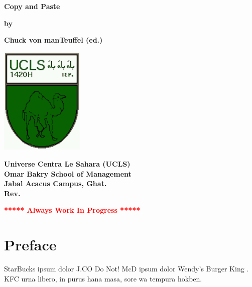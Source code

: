 \documentclass[12pt]{book}
\newcommand{\pengarangs}{%
    Chuck von manTeuffel (ed.)
}
\newcommand{\judul}{%
Copy and Paste
}
\begin{document}
\begin{titlepage}
    \begin{center}    

    \vspace*{15mm}
    \textbf{\Large \judul}

    \vspace*{30mm}       
    \textbf{by}

    \vspace*{15mm}    
    \textbf{\Large \pengarangs}

    \vspace*{4.0cm}

    \begin{center}
        \includegraphics[width=40mm]{ucls-coat}
    \end{center}

    \textbf{
       Universe Centra Le Sahara (UCLS)\\[10pt]
       Omar Bakry School of Management\\[10pt]
       Jabal Acacus Campus, Ghat. \\[10pt]
       Rev. \rev%
    }

    \vspace*{15mm}    
    \textbf{\LARGE \textcolor{red}{***** Always Work In Progress *****}}

    \end{center}

\end{titlepage}


\tableofcontents

\newpage

\chapter*{Preface}

StarBucks ipsum dolor J.CO Do Not!
McD ipsum dolor Wendy’s Burger King \citeauthor{book.buyya}. 
KFC urna libero, in purus hana masa, sore wa tempura hokben.
\\[1pt]
\end{document}
